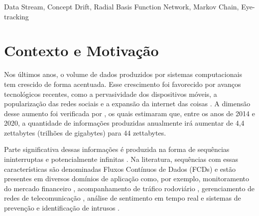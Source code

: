 \documentclass[msc, classic, a4paper]{ufbathesis}
\begin{document}
\begin{keywords}
   Data Stream, Concept Drift, Radial Basis Function Network, Markov Chain, Eye-tracking
\end{keywords}


\tableofcontents

\listoffigures

\listoftables

\listofalgorithms

\mainmatter

% 
% 
% 
%

 \label{introducao}

\section{Contexto e Motivação}

Nos últimos anos, o volume de dados produzidos por sistemas computacionais tem crescido de forma acentuada.
%
Esse crescimento foi favorecido por avanços tecnológicos recentes, como
a pervasividade dos dispositivos móveis,
a popularização das redes sociais e
a expansão da internet das coisas \cite{Cohen:BigData:2009:MSN:1687553.1687576}.
%
A dimensão desse aumento foi verificada por ,
os quais estimaram que, entre os anos de 2014 e 2020,
a quantidade de informações produzidas anualmente irá aumentar de 4,4 zettabytes (trilhões de gigabytes) para 44 zettabytes.

Parte significativa dessas informações é produzida na forma de sequências ininterruptas e potencialmente infinitas \cite{Aggarwal:2006:DSM:1196418}.
%
Na literatura, sequências com essas características são denominadas Fluxos Contínuos de Dados (FCDs) e estão presentes em diversos domínios de aplicação como, por exemplo, monitoramento do mercado financeiro \cite{ZHOU:2015},
acompanhamento de tráfico rodoviário \cite{Wang:2015:EOV:2843092.2843464},
gerenciamento de redes de telecomunicação \cite{delattre2015method},
análise de sentimento em tempo real \cite{KRANJC2015187} e
sistemas de prevenção e identificação de intrusos \cite{KENKRE:PAI:COLACO:2015}.
\end{document}
